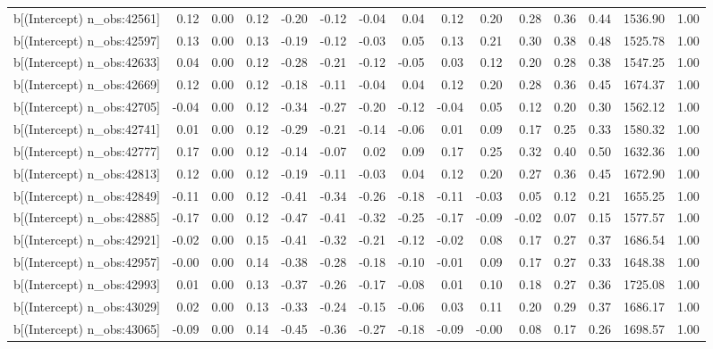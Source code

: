 \begin{table}[ht]
\begin{tabular}{rrrrrrrrrrrrrrr}
  b[(Intercept) n\_obs:42561] & 0.12 & 0.00 & 0.12 & -0.20 & -0.12 & -0.04 & 0.04 & 0.12 & 0.20 & 0.28 & 0.36 & 0.44 & 1536.90 & 1.00 \\ 
  b[(Intercept) n\_obs:42597] & 0.13 & 0.00 & 0.13 & -0.19 & -0.12 & -0.03 & 0.05 & 0.13 & 0.21 & 0.30 & 0.38 & 0.48 & 1525.78 & 1.00 \\ 
  b[(Intercept) n\_obs:42633] & 0.04 & 0.00 & 0.12 & -0.28 & -0.21 & -0.12 & -0.05 & 0.03 & 0.12 & 0.20 & 0.28 & 0.38 & 1547.25 & 1.00 \\ 
  b[(Intercept) n\_obs:42669] & 0.12 & 0.00 & 0.12 & -0.18 & -0.11 & -0.04 & 0.04 & 0.12 & 0.20 & 0.28 & 0.36 & 0.45 & 1674.37 & 1.00 \\ 
  b[(Intercept) n\_obs:42705] & -0.04 & 0.00 & 0.12 & -0.34 & -0.27 & -0.20 & -0.12 & -0.04 & 0.05 & 0.12 & 0.20 & 0.30 & 1562.12 & 1.00 \\ 
  b[(Intercept) n\_obs:42741] & 0.01 & 0.00 & 0.12 & -0.29 & -0.21 & -0.14 & -0.06 & 0.01 & 0.09 & 0.17 & 0.25 & 0.33 & 1580.32 & 1.00 \\ 
  b[(Intercept) n\_obs:42777] & 0.17 & 0.00 & 0.12 & -0.14 & -0.07 & 0.02 & 0.09 & 0.17 & 0.25 & 0.32 & 0.40 & 0.50 & 1632.36 & 1.00 \\ 
  b[(Intercept) n\_obs:42813] & 0.12 & 0.00 & 0.12 & -0.19 & -0.11 & -0.03 & 0.04 & 0.12 & 0.20 & 0.27 & 0.36 & 0.45 & 1672.90 & 1.00 \\ 
  b[(Intercept) n\_obs:42849] & -0.11 & 0.00 & 0.12 & -0.41 & -0.34 & -0.26 & -0.18 & -0.11 & -0.03 & 0.05 & 0.12 & 0.21 & 1655.25 & 1.00 \\ 
  b[(Intercept) n\_obs:42885] & -0.17 & 0.00 & 0.12 & -0.47 & -0.41 & -0.32 & -0.25 & -0.17 & -0.09 & -0.02 & 0.07 & 0.15 & 1577.57 & 1.00 \\ 
  b[(Intercept) n\_obs:42921] & -0.02 & 0.00 & 0.15 & -0.41 & -0.32 & -0.21 & -0.12 & -0.02 & 0.08 & 0.17 & 0.27 & 0.37 & 1686.54 & 1.00 \\ 
  b[(Intercept) n\_obs:42957] & -0.00 & 0.00 & 0.14 & -0.38 & -0.28 & -0.18 & -0.10 & -0.01 & 0.09 & 0.17 & 0.27 & 0.33 & 1648.38 & 1.00 \\ 
  b[(Intercept) n\_obs:42993] & 0.01 & 0.00 & 0.13 & -0.37 & -0.26 & -0.17 & -0.08 & 0.01 & 0.10 & 0.18 & 0.27 & 0.36 & 1725.08 & 1.00 \\ 
  b[(Intercept) n\_obs:43029] & 0.02 & 0.00 & 0.13 & -0.33 & -0.24 & -0.15 & -0.06 & 0.03 & 0.11 & 0.20 & 0.29 & 0.37 & 1686.17 & 1.00 \\ 
  b[(Intercept) n\_obs:43065] & -0.09 & 0.00 & 0.14 & -0.45 & -0.36 & -0.27 & -0.18 & -0.09 & -0.00 & 0.08 & 0.17 & 0.26 & 1698.57 & 1.00 \\ 

\end{tabular}
\end{table}
